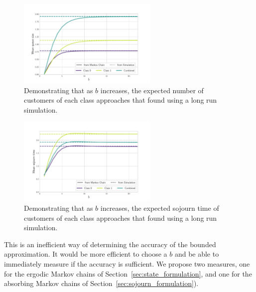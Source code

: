 \documentclass{article}
\begin{document}
\begin{figure}
  \begin{center}
    \includegraphics[width=0.6\textwidth]{img/queue_size_bound_approaches.pdf}
    \caption{Demonstrating that as $b$ increases, the expected number of
    customers of each class approaches that found using a long run simulation.}
    \label{fig:kpi_approaches_numcusts}
  \end{center}
\end{figure}

\begin{figure}
  \begin{center}
    \includegraphics[width=0.6\textwidth]{img/sojourn_time_bound_approaches.pdf}
    \caption{Demonstrating that as $b$ increases, the expected sojourn time of
    customers of each class approaches that found using a long run simulation.}
    \label{fig:kpi_approaches_sojourn}
  \end{center}
\end{figure}

This is an inefficient way of determining the accuracy of the bounded
approximation. It would be more efficient to choose a $b$ and be able to
immediately measure if the accuracy is sufficient. We propose two measures, one
for the ergodic Markov chains of Section~\ref{sec:state_formulation}, and one
for the absorbing Markov chains of Section~\ref{sec:sojourn_formulation}).
\end{document}

